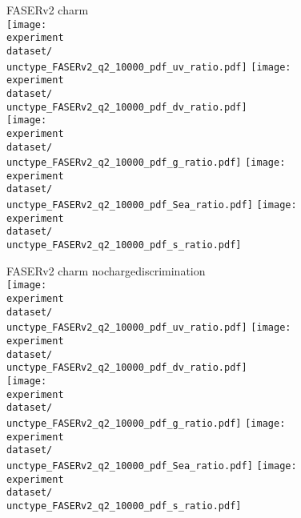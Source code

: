 \documentclass{article}
\newcommand{\figw}{70mm}
\newcommand{\experiment}{FASERv2}
\newcommand{\unctype}{uncor}
\begin{document}
\newpage

FASERv2 charm\\
\renewcommand{\dataset}{_charm}
\texttt{[image: \\experiment\\dataset/\\unctype\_FASERv2\_q2\_10000\_pdf\_uv\_ratio.pdf]}
\texttt{[image: \\experiment\\dataset/\\unctype\_FASERv2\_q2\_10000\_pdf\_dv\_ratio.pdf]}\\
\texttt{[image: \\experiment\\dataset/\\unctype\_FASERv2\_q2\_10000\_pdf\_g\_ratio.pdf]}
\texttt{[image: \\experiment\\dataset/\\unctype\_FASERv2\_q2\_10000\_pdf\_Sea\_ratio.pdf]}
\texttt{[image: \\experiment\\dataset/\\unctype\_FASERv2\_q2\_10000\_pdf\_s\_ratio.pdf]}

\newpage

FASERv2 charm nochargediscrimination\\
\renewcommand{\dataset}{_charm_nochargediscrimination}
\texttt{[image: \\experiment\\dataset/\\unctype\_FASERv2\_q2\_10000\_pdf\_uv\_ratio.pdf]}
\texttt{[image: \\experiment\\dataset/\\unctype\_FASERv2\_q2\_10000\_pdf\_dv\_ratio.pdf]}\\
\texttt{[image: \\experiment\\dataset/\\unctype\_FASERv2\_q2\_10000\_pdf\_g\_ratio.pdf]}
\texttt{[image: \\experiment\\dataset/\\unctype\_FASERv2\_q2\_10000\_pdf\_Sea\_ratio.pdf]}
\texttt{[image: \\experiment\\dataset/\\unctype\_FASERv2\_q2\_10000\_pdf\_s\_ratio.pdf]}
\end{document}
